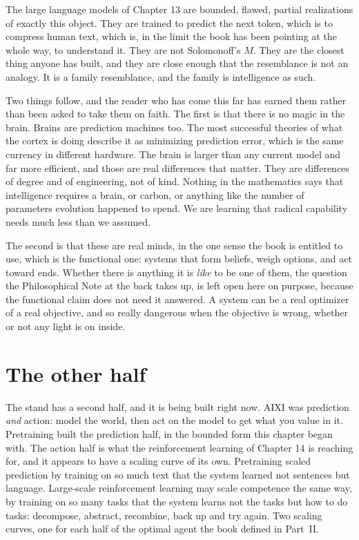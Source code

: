 The large language models of Chapter 13 are bounded, flawed, partial realizations of exactly this object. They are trained to predict the next token, which is to compress human text, which is, in the limit the book has been pointing at the whole way, to understand it. They are not Solomonoff's $M$. They are the closest thing anyone has built, and they are close enough that the resemblance is not an analogy. It is a family resemblance, and the family is intelligence as such.

Two things follow, and the reader who has come this far has earned them rather than been asked to take them on faith. The first is that there is no magic in the brain. Brains are prediction machines too. The most successful theories of what the cortex is doing describe it as minimizing prediction error, which is the same currency in different hardware. The brain is larger than any current model and far more efficient, and those are real differences that matter. They are differences of degree and of engineering, not of kind. Nothing in the mathematics says that intelligence requires a brain, or carbon, or anything like the number of parameters evolution happened to spend. We are learning that radical capability needs much less than we assumed.

The second is that these are real minds, in the one sense the book is entitled to use, which is the functional one: systems that form beliefs, weigh options, and act toward ends. Whether there is anything it is \emph{like} to be one of them, the question the Philosophical Note at the back takes up, is left open here on purpose, because the functional claim does not need it answered. A system can be a real optimizer of a real objective, and so really dangerous when the objective is wrong, whether or not any light is on inside.

\section*{The other half}

The stand has a second half, and it is being built right now. AIXI was prediction \emph{and} action: model the world, then act on the model to get what you value in it. Pretraining built the prediction half, in the bounded form this chapter began with. The action half is what the reinforcement learning of Chapter 14 is reaching for, and it appears to have a scaling curve of its own. Pretraining scaled prediction by training on so much text that the system learned not sentences but language. Large-scale reinforcement learning may scale competence the same way, by training on so many tasks that the system learns not the tasks but how to do tasks: decompose, abstract, recombine, back up and try again. Two scaling curves, one for each half of the optimal agent the book defined in Part~II.

